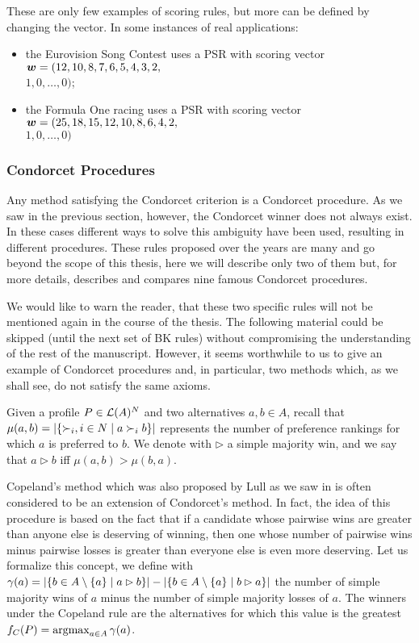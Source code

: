\noindent These are only few examples of scoring rules, but more can be defined by changing the vector. In some instances of real applications: 
\begin{itemize}
	\item the Eurovision Song Contest uses a \acs{PSR} with scoring vector $\bm{w}=(12,10,8,7,6,5,4,3,2,$ \\$1,0, \dots,0)$;
	\item the Formula One racing uses a \acs{PSR} with scoring vector
	$\bm{w}=(25,18,15,12,10,8,6,4,2,$\\$1,0,\dots,0)$
\end{itemize}




\subsubsection{Condorcet Procedures}
Any method satisfying the Condorcet criterion is a Condorcet procedure. As we saw in the previous section, however, the Condorcet winner does not always exist. In these cases different ways to solve this ambiguity have been used, resulting in different procedures. These rules proposed over the years are many and go beyond the scope of this thesis, here we will describe only two of them but, for more details, \citet{Fishburn1977} describes and compares nine famous Condorcet procedures.

We would like to warn the reader, that these two specific rules will not be mentioned again in the course of the thesis.
The following material could be skipped (until the next set of BK rules) without compromising the understanding of the rest of the manuscript.
However, it seems worthwhile to us to give an example of Condorcet procedures and, in particular, two methods which, as we shall see, do not satisfy the same axioms.

Given a profile $P\in\mathcal{L}(A)^{N}$ and two alternatives $a,b\in A$, recall that $\mu(a,b)=|\{\mathop{\prefi}, i \in N \suchthat a\prefi b\}|$ represents the number of preference rankings for which $a$ is preferred to $b$.
We denote with $\rhd$ a simple majority win, and we say that $a \rhd b$ iff $\mu(a,b)>\mu(b,a)$.

\begin{indented}[Copeland]
	Copeland's method \textemdash which was also proposed by Lull as we saw in  \textemdash is often considered to be an extension of Condorcet's method. 
	In fact, the idea of this procedure is based on the fact that if a candidate whose pairwise wins are greater than anyone else is deserving of winning, then one whose number of pairwise wins minus pairwise losses is greater than everyone else is even more deserving.
	Let us formalize this concept, we define with $\gamma(a)=|\{b \in A\setminus \{a\} \suchthat a \rhd b\}|- |\{b \in A\setminus \{a\} \suchthat b \rhd a\}|$ the number of simple majority wins of $a$ minus the number of simple majority losses of $a$.
	The winners under the Copeland rule are the alternatives for which this value is the greatest $f_{C}(P)=\operatorname*{argmax}_{a\in A}\gamma(a)$.
\end{indented}

